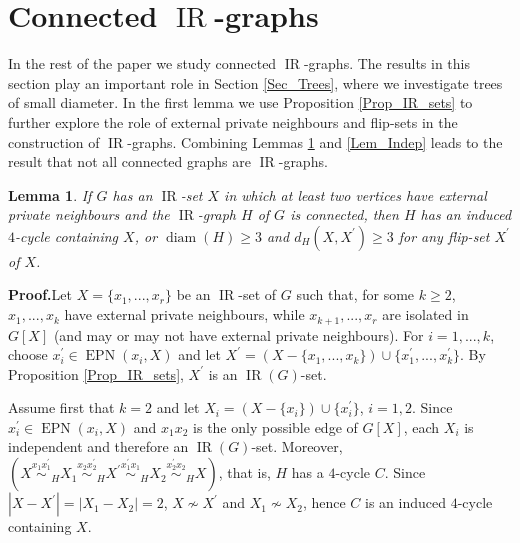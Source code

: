 \documentclass[12pt]{article}%
\newtheorem{lemma}[theorem]{Lemma}
\begin{document}
\section{Connected $\operatorname{IR}$-graphs}

\label{Sec_Con}In the rest of the paper we study connected $\operatorname{IR}%
$-graphs. The results in this section play an important role in Section
\ref{Sec_Trees}, where we investigate trees of small diameter. In the first
lemma we use Proposition \ref{Prop_IR_sets} to further explore the role of
external private neighbours and flip-sets in the construction of
$\operatorname{IR}$-graphs. Combining Lemmas \ref{Lem_Not_independent} and
\ref{Lem_Indep} leads to the result that not all connected graphs are
$\operatorname{IR}$-graphs.

\begin{lemma}
\label{Lem_Not_independent}If $G$ has an $\operatorname{IR}$-set $X$ in which
at least two vertices have external private neighbours and the
$\operatorname{IR}$-graph $H$ of $G$ is connected, then $H$ has an induced
$4$-cycle containing $X$, or $\operatorname{diam}(H)\geq3$ and $d_{H}%
(X,X^{\prime})\geq3$ for any flip-set $X^{\prime}$ of $X$.
\end{lemma}

\noindent\textbf{Proof.\hspace{0.1in}}Let $X=\{x_{1},...,x_{r}\}$ be an
$\operatorname{IR}$-set of $G$ such that, for some $k\geq2$, $x_{1},...,x_{k}$
have external private neighbours, while $x_{k+1},...,x_{r}$ are isolated in
$G[X]$ (and may or may not have external private neighbours). For $i=1,...,k$,
choose $x_{i}^{\prime}\in\operatorname{EPN}(x_{i},X)$ and let $X^{\prime
}=(X-\{x_{1},...,x_{k}\})\cup\{x_{1}^{\prime},...,x_{k}^{\prime}\}$. By
Proposition \ref{Prop_IR_sets}, $X^{\prime}$ is an $\operatorname{IR}(G)$-set.

Assume first that $k=2$ and let $X_{i}=(X-\{x_{i}\})\cup\{x_{i}^{\prime}\}$,
$i=1,2$. Since $x_{i}^{\prime}\in\operatorname{EPN}(x_{i},X)$ and $x_{1}x_{2}$
is the only possible edge of $G[X]$, each $X_{i}$ is independent and therefore
an $\operatorname{IR}(G)$-set. Moreover, $(X\overset{x_{1}x_{1}^{\prime}%
}{\sim}_{H}X_{1}\overset{x_{2}x_{2}^{\prime}}{\sim}_{H}X^{\prime
}\overset{x_{1}^{\prime}x_{1}}{\sim}_{H}X_{2}\overset{x_{2}^{\prime}%
x_{2}}{\sim}_{H}X)$, that is, $H$ has a $4$-cycle $C$. Since $|X-X^{\prime
}|=|X_{1}-X_{2}|=2$, $X\nsim X^{\prime}$ and $X_{1}\nsim X_{2}$, hence $C$ is
an induced $4$-cycle containing $X$.
\end{document}
